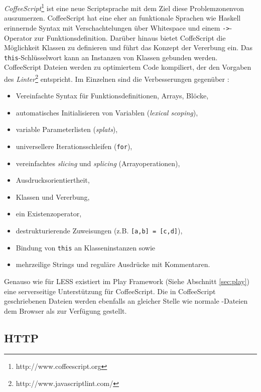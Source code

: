\textit{CoffeeScript}\footnote{http://www.coffeescript.org} ist eine neue Scriptsprache mit dem Ziel
diese \glqq Problemzonen\grqq von  auszumerzen. CoffeeScript hat eine eher an funktionale
Sprachen wie Haskell erinnernde Syntax mit Verschachtelungen über Whitespace und einem
\texttt{->}-Operator zur Funktionsdefinition. Darüber hinaus bietet CoffeScript die Möglichkeit
Klassen zu definieren und führt das Konzept der Vererbung ein. Das \texttt{this}-Schlüsselwort kann
an Instanzen von Klassen gebunden werden. CoffeeScript Dateien werden zu optimiertem  Code
kompiliert, der den Vorgaben des \textit{
Linter}\footnote{http://www.javascriptlint.com/} entspricht. Im Einzelnen sind die Verbesserungen
gegenüber :

\begin{itemize}
  \item Vereinfachte Syntax für Funktionsdefinitionen, Arrays, Blöcke,
  \item automatisches Initialisieren von Variablen (\textit{lexical scoping}),
  \item variable Parameterlisten (\textit{splats}),
  \item universellere Iterationsschleifen (\texttt{for}),
  \item vereinfachtes \textit{slicing} und \textit{splicing} (Arrayoperationen),
  \item Ausdrucksorientiertheit,
  \item Klassen und Vererbung,
  \item ein Existenzoperator,
  \item destrukturierende Zuweisungen (z.B. \texttt{[a,b] = [c,d]}),
  \item Bindung von \texttt{this} an Klasseninstanzen sowie
  \item mehrzeilige Strings und reguläre Ausdrücke mit Kommentaren.
\end{itemize}

Genauso wie für LESS existiert im Play Framework (Siehe Abschnitt \ref{sec:play}) eine serverseitige
Unterstützung  für CoffeeScript. Die in CoffeeScript geschriebenen Dateien  werden ebenfalls an
gleicher Stelle wie normale -Dateien dem  Browser als  zur Verfügung gestellt.

\subsection{HTTP}

